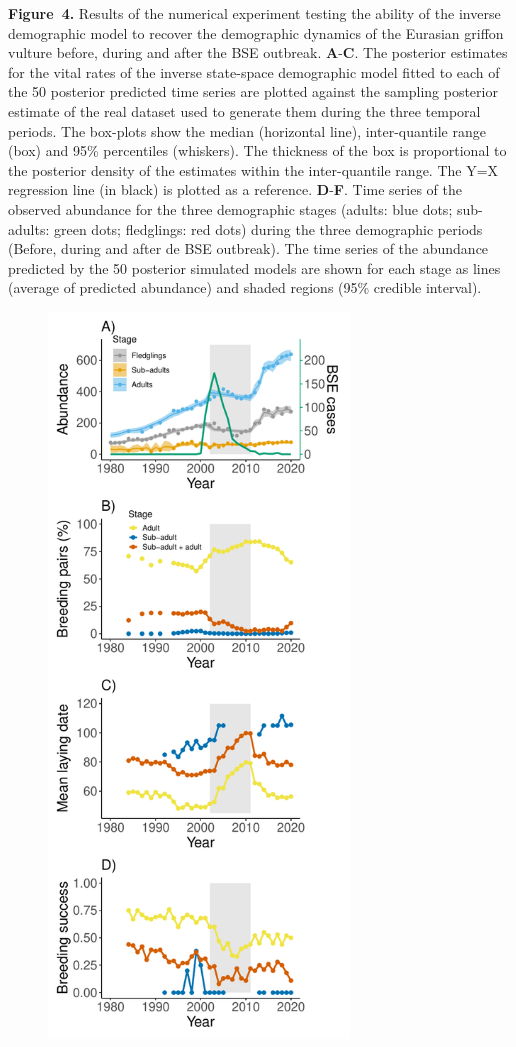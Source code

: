 \documentclass[12pt]{article}
\begin{document}
\noindent \textbf{Figure~4.} Results of the numerical experiment testing the ability of the inverse demographic model to recover the demographic dynamics of the Eurasian griffon vulture before, during and after the BSE outbreak. \textbf{A}-\textbf{C}. The posterior estimates for the vital rates of the inverse state-space demographic model fitted to each of the 50 posterior predicted time series are plotted against the sampling posterior estimate of the real dataset used to generate them during the three temporal periods. The box-plots show the median (horizontal line), inter-quantile range (box) and 95\% percentiles (whiskers). The thickness of the box is proportional to the posterior density of the estimates within the inter-quantile range. The Y=X regression line (in black) is plotted as a reference. \textbf{D}-\textbf{F}. Time series of the observed abundance for the three demographic stages (adults: blue dots; sub-adults: green dots; fledglings: red dots) during the three demographic periods (Before, during and after de BSE outbreak). The time series of the abundance predicted by the 50 posterior simulated models are shown for each stage as lines (average of predicted abundance) and shaded regions (95\% credible interval). \\

\newpage
\begin{figure}[h!]
	\caption{}
	\label{Fig1}
	\begin{center}
		\includegraphics[width=8cm]{figs/Fig1.pdf}
	\end{center}
\end{figure}
\end{document}
